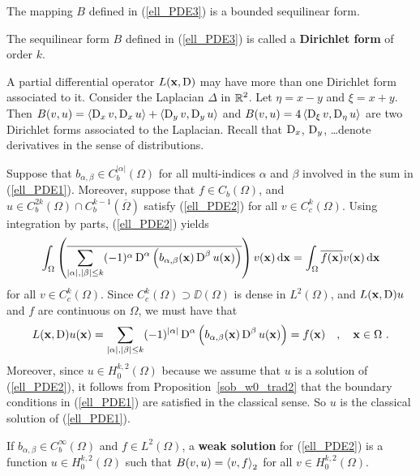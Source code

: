 \begin{prop} \label{ell_Bblf}
The mapping $B$ defined in (\ref{ell_PDE3}) is a bounded sequilinear form.
\end{prop}

The sequilinear form $B$ defined in (\ref{ell_PDE3}) is
called a {\bfseries Dirichlet form} of order $k$.

\begin{rmk}
A partial differential operator $L(\mathbf{x},\operatorname{D})$ may have more than one
Dirichlet form associated to it.  Consider the Laplacian
$\displaystyle \Delta$ in $\displaystyle \mathbb{R}^2$.  Let $\eta=x-y$ and
$\xi = x+y$.
Then $B(v,u) = \left\langle{\operatorname{D}_x v} , {\operatorname{D}_x u}\right\rangle + \left\langle{\operatorname{D}_y v} , {\operatorname{D}_y u}\right\rangle$ and
$B(v,u) = 4\left\langle{\operatorname{D}_\xi v} , {\operatorname{D}_\eta u}\right\rangle$ are two Dirichlet forms associated
to the Laplacian.  Recall that $\operatorname{D}_x$, $\operatorname{D}_y$, \ldots denote derivatives
in the sense of distributions.
\end{rmk}

Suppose that $\displaystyle b_{\alpha,\beta}\in C^{|\alpha|}_b(\Omega)$
for all multi-indices $\alpha$ and $\beta$ involved in the sum in
(\ref{ell_PDE1}).  Moreover, suppose that $f\in C_b(\Omega)$, and
$\displaystyle u \in C^{2k}_b(\Omega)\cap C^{k-1}_b(\overline{\Omega})$
satisfy (\ref{ell_PDE2}) for all $\displaystyle v \in C^{k}_c(\Omega)$.  Using
integration by parts, (\ref{ell_PDE2}) yields
\[
\int_\Omega \left( \overline{\sum_{|\alpha|,|\beta|\leq k} (-1)^\alpha \operatorname{D}^\alpha
\left( b_{\alpha,\beta}(\mathbf{x}) \operatorname{D}^\beta u(\mathbf{x})\right)}\right)
v(\mathbf{x}) \,\mathrm{d}{\mathbf{x}} = \int_\Omega \overline{f(\mathbf{x})} v(\mathbf{x})
\,\mathrm{d}{\mathbf{x}}
\]
for all $\displaystyle v \in C^{k}_c(\Omega)$.
Since $\displaystyle C^{k}_c(\Omega) \supset \DD(\Omega)$ is
dense in $\displaystyle L^2(\Omega)$, and $L(\mathbf{x},\operatorname{D})u$ and $f$
are continuous on $\Omega$, we must have that
\[
L(\mathbf{x},\operatorname{D})u(\mathbf{x}) =
\sum_{|\alpha|,|\beta|\leq k} (-1)^{|\alpha|} \operatorname{D}^\alpha
\left( b_{\alpha,\beta}(\mathbf{x}) \operatorname{D}^\beta u(\mathbf{x})\right) = f(\mathbf{x})
\quad , \quad \mathbf{x} \in \Omega \ .
\]
Moreover, since $\displaystyle u \in H^{k,2}_0(\Omega)$ because we assume that
$u$ is a solution of (\ref{ell_PDE2}), it follows from
Proposition~\ref{sob_w0_trad2} that the boundary
conditions in (\ref{ell_PDE1}) are satisfied in the classical sense.
So $u$ is the classical solution of (\ref{ell_PDE1}).

\begin{defn} \label{ell_wf_Dir_probl}
If $\displaystyle b_{\alpha,\beta} \in C^\infty_b(\Omega)$ and
$\displaystyle f \in L^2(\Omega)$,
a {\bfseries weak solution}
for (\ref{ell_PDE2}) is a function
$\displaystyle u \in H^{k,2}_0(\Omega)$ such that
$\displaystyle B(v,u) = \left\langle{v} , {f}\right\rangle_{2}$ for all
$\displaystyle v \in H^{k,2}_0(\Omega)$.
\end{defn}


